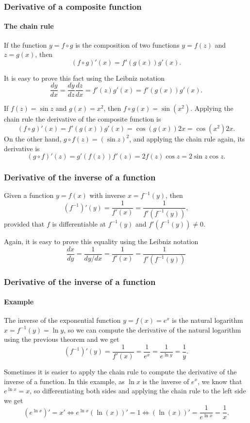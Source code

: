 \begin{frame}
	\frametitle{Derivative of a composite function}
	\framesubtitle{The chain rule}
	\begin{theorem} If the function $y=f\circ g$ is the composition of two functions $y=f(z)$ and $z=g(x)$, then
		\[ 
			(f\circ g)'(x)=f'(g(x))g'(x).
		\]
	\end{theorem}
	
	It is easy to prove this fact using the Leibniz notation
	\[
		\frac{dy}{dx}=\frac{dy}{dz}\frac{dz}{dx}=f'(z)g'(x)=f'(g(x))g'(x).
	\]
	
	 If $f(z)=\sin z$ and $g(x)=x^2$, then $f\circ g(x)=\sin(x^2)$. Applying the chain rule the derivative of the composite function is
	\[
		(f\circ g)'(x)=f'(g(x))g'(x) = \cos(g(x)) 2x = \cos(x^2)2x.
	\]
	On the other hand, $g\circ f(z)= (\sin z)^2$, and applying the chain rule again, its derivative is
	\[
		(g\circ f)'(z)=g'(f(z))f'(z) = 2f(z)\cos z = 2\sin z\cos z.
	\]
\end{frame}


\begin{frame}
	\frametitle{Derivative of the inverse of a function}
	\begin{theorem}
		Given a function $y=f(x)$ with inverse $x=f^{-1}(y)$, then 
		\[
			\left(f^{-1}\right)'(y)=\frac{1}{f'(x)}=\frac{1}{f'(f^{-1}(y))},
		\]
		provided that $f$ is differentiable at $f^{-1}(y)$ and $f'(f^{-1}(y))\neq 0$.
	\end{theorem}
	
	Again, it is easy to prove this equality using the Leibniz notation
	\[
		\frac{dx}{dy}=\frac{1}{dy/dx}=\frac{1}{f'(x)}=\frac{1}{f'(f^{-1}(y))}
	\]
\end{frame}


\begin{frame}
	\frametitle{Derivative of the inverse of a function}
	\framesubtitle{Example}
	The inverse of the exponential function $y=f(x)=e^x$ is the natural logarithm $x=f^{-1}(y)=\ln y$, so we can compute the derivative of the natural logarithm using the previous theorem and we get
	\[
		\left(f^{-1}\right)'(y)=\frac{1}{f'(x)}=\frac{1}{e^x}=\frac{1}{e^{\ln y}}=\frac{1}{y}.
	\]
	
	 Sometimes it is easier to apply the chain rule to compute the derivative of the inverse of a function. 
	In this example, as $\ln x$ is the inverse of $e^x$, we know that $e^{\ln x}=x$, so differentiating both sides and applying the chain rule to the left side we get
	\[
		(e^{\ln x})'=x' \Leftrightarrow e^{\ln x}(\ln(x))' = 1 \Leftrightarrow (\ln(x))'=\frac{1}{e^{\ln x}}=\frac{1}{x}.
	\]
\end{frame}



